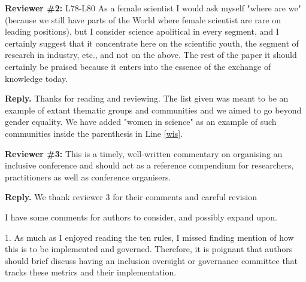 \documentclass{article}
\newenvironment{Reply}{\noindent\color{BlueViolet}\textbf{Reply.}}{\vspace{1em}}
\begin{document}
\textbf{Reviewer \#2:}
L78-L80 As a female scientist I would ask myself "where are we" (because we still have parts of the World where female scientist are rare on leading positions), but I consider science apolitical in every segment, and I certainly suggest that it concentrate here on the scientific youth, the segment of research in industry, etc., and not on the above.
The rest of the paper it should certainly be praised because it enters into the essence of the exchange of knowledge today.

\begin{Reply}
Thanks for reading and reviewing. The list given was meant to be an example of extant thematic groups and communities
and we aimed to go beyond gender equality. 
We have added "women in science" as an example of such communities inside the parenthesis in Line  \ref{wis}.

\end{Reply}

\textbf{Reviewer \#3:} 
This is a timely, well-written commentary on organising an inclusive conference and should act as a reference compendium for researchers, practitioners as well as conference organisers.

\begin{Reply}
    We thank reviewer 3 for their comments and careful revision 
\end{Reply}

I have some comments for authors to consider, and possibly expand upon.

1. As much as I enjoyed reading the ten rules, I missed finding mention of how this is to be implemented and governed. Therefore, it is poignant that authors should brief discuss having an inclusion oversight or governance committee that tracks these metrics and their implementation.
\end{document}
